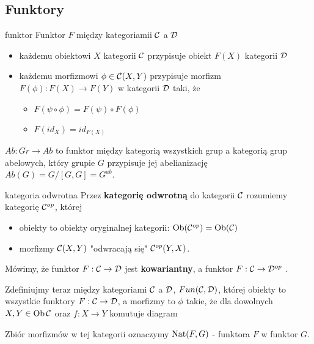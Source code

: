 \subsection{Funktory}

\begin{definition}{funktor}{}
  Funktor $F$ między kategoriamii $\mathcal{C}$ a $\mathcal{D}$
  \begin{itemize}
    \item każdemu obiektowi $X$ kategorii $\mathcal{C}$ przypisuje obiekt $F(X)$ kategorii $\mathcal{D}$
    \item każdemu morfizmowi $\phi\in\mathcal{C}(X, Y)$ przypisuje morfizm $F(\phi):F(X)\to F(Y)$ w kategorii $\mathcal{D}$ taki, że 
      \begin{itemize}
        \item $F(\psi\circ\phi)=F(\psi)\circ F(\phi)$
        \item $F(id_X)=id_{F(X)}$
      \end{itemize}
  \end{itemize}
\end{definition}

\begin{example}{}{}
  $Ab:Gr\to Ab$ to funktor między kategorią wszystkich grup a kategorią grup abelowych, który grupie $G$ przypisuje jej abelianizację $Ab(G)=G/[G,G]=G^{ab}$.
\end{example}

\begin{definition}{kategoria odwrotna}{}
  Przez \textbf{kategorię odwrotną} do kategorii $\mathcal{C}$ rozumiemy kategorię $\mathcal{C}^{op}$, której
  \begin{itemize}
    \item obiekty to obiekty oryginalnej kategorii: $\operatorname{Ob}(\mathcal{C}^{op})=\operatorname{Ob}(\mathcal{C})$
    \item morfizmy $\mathcal{C}(X, Y)$ "odwracają się" $\mathcal{C}^{op}(Y, X)$.
  \end{itemize}
\end{definition}
%

Mówimy, że funktor $F:\mathcal{C}\to \mathcal{D}$ jest \textbf{kowariantny}, a funktor $F:\mathcal{C}\to\mathcal{D}^{op}$ .

Zdefiniujmy teraz  między kategoriami $\mathcal{C}$ a $\mathcal{D}$, $Fun(\mathcal{C}, \mathcal{D})$, której obiekty to wszystkie funktory $F:\mathcal{C}\to\mathcal{D}$, a morfizmy to $\phi$ takie, że dla dowolnych $X, Y\in\operatorname{Ob}\mathcal{C}$ oraz $f:X\to Y$ komutuje diagram
\begin{center}
\end{center}
Zbiór morfizmów w tej kategorii oznaczymy $\operatorname{Nat}(F, G)$ -  funktora $F$ w funktor $G$.

